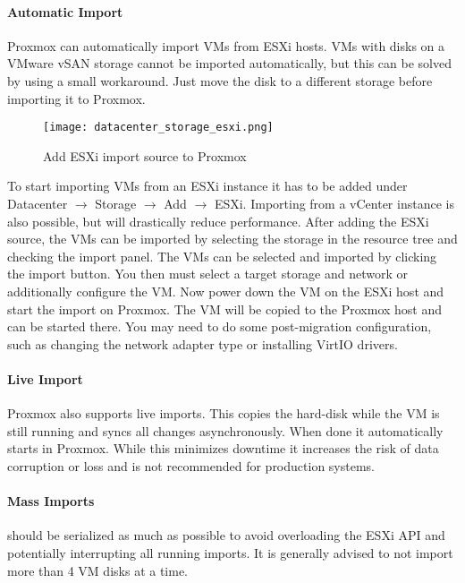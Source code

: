 \paragraph{Automatic Import}
Proxmox can automatically import VMs from ESXi hosts. VMs with disks on a VMware vSAN storage cannot be imported automatically, but this can be solved by using a small workaround. Just move the disk to a different storage before importing it to Proxmox.
\begin{figure}[H]
    \centering
    \texttt{[image: datacenter\_storage\_esxi.png]}
    \caption{Add ESXi import source to Proxmox}
    \label{fig:proxmox_add_esxi_source}
\end{figure}
To start importing VMs from an ESXi instance it has to be added under Datacenter $\rightarrow$ Storage $\rightarrow$ Add $\rightarrow$ ESXi. \newline
Importing from a vCenter instance is also possible, but will drastically reduce performance.\newline
After adding the ESXi source, the VMs can be imported by selecting the storage in the resource tree and checking the import panel. The VMs can be selected and imported by clicking the import button. You then must select a target storage and network or additionally configure the VM. Now power down the VM on the ESXi host and start the import on Proxmox. The VM will be copied to the Proxmox host and can be started there. You may need to do some post-migration configuration, such as changing the network adapter type or installing VirtIO drivers.

\paragraph{Live Import}
Proxmox also supports live imports. This copies the hard-disk while the VM is still running and syncs all changes asynchronously. When done it automatically starts in Proxmox. While this minimizes downtime it increases the risk of data corruption or loss and is not recommended for production systems.

\paragraph{Mass Imports} should be serialized as much as possible to avoid overloading the ESXi API and potentially interrupting all running imports.
It is generally advised to not import more than 4 VM disks at a time.

